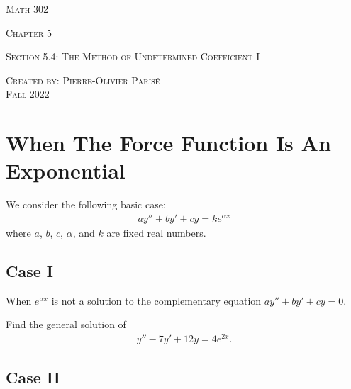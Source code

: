 \documentclass[12pt,a4paper]{article}
\newcounter{example}[section]
\begin{document}
\thispagestyle{empty}

\begin{center}
\vspace*{2.5cm}

{\Huge \textsc{Math 302}}

\vspace*{2cm}

{\LARGE \textsc{Chapter 5}} 

\vspace*{0.75cm}

\noindent\textsc{Section 5.4: The Method of Undetermined Coefficient I}

\vspace*{0.75cm}

\tableofcontents

\vfill

\noindent \textsc{Created by: Pierre-Olivier Paris{\'e}} \\
\textsc{Fall 2022}
\end{center}

\newpage

\section{When The Force Function Is An Exponential}

We consider the following basic case:
	\begin{align*}
	a y'' + by' + cy = k e^{\alpha x}
	\end{align*}
where $a$, $b$, $c$, $\alpha$, and $k$ are fixed real numbers.

\subsection{Case I}

When $e^{\alpha x}$ is not a solution to the complementary equation $ay'' + by' + cy = 0$.

\begin{example}
Find the general solution of
	\begin{align*}
	y'' - 7y' + 12 y = 4e^{2x} .
	\end{align*}
\end{example}

\newpage

\subsection{Case II}
\end{document}

